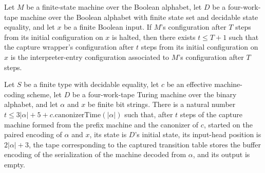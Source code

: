 \begin{lemma}
\label{Turing.universalCapture_start}
\leanok
{}
Let $M$ be a finite-state machine over the Boolean alphabet, let $D$ be a four-work-tape
machine over the Boolean alphabet with finite state set and decidable state equality,
and let $x$ be a finite Boolean input. If $M$’s configuration after $T$ steps from its
initial configuration on $x$ is halted, then there exists $t\le T+1$ such that the
capture wrapper’s configuration after $t$ steps from its initial configuration on $x$ is
the interpreter-entry configuration associated to $M$’s configuration after $T$ steps.
\end{lemma}

\begin{lemma}
\label{Turing.universal_captured_table}
\leanok
{}
Let $S$ be a finite type with decidable equality, let $c$ be an effective machine-coding
scheme, let $D$ be a four-work-tape Turing machine over the binary alphabet, and let
$\alpha$ and $x$ be finite bit strings. There is a natural number $t \le
3|\alpha|+5+c.\mathrm{canonizerTime}(|\alpha|)$ such that, after $t$ steps of the
capture machine formed from the prefix machine and the canonizer of $c$, started on the
paired encoding of $\alpha$ and $x$, its state is $D$’s initial state, its input-head
position is $2|\alpha|+3$, the tape corresponding to the captured transition table
stores the buffer encoding of the serialization of the machine decoded from $\alpha$,
and its output is empty.
\end{lemma}
